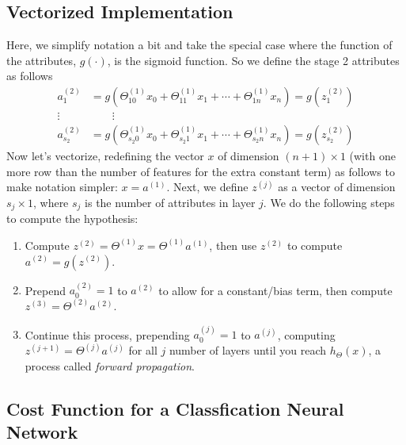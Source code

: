 \documentclass[12pt]{article}
\begin{document}
\newpage
\subsection{Vectorized Implementation}

Here, we simplify notation a bit and take the special case where the
function of the attributes, $g(\cdot)$, is the sigmoid
function. So we define the stage 2 attributes as follows
\begin{align*}
    a_1^{(2)} &= g\left(\Theta_{10}^{(1)} x_0 
	+ \Theta_{11}^{(1)} x_1 + \cdots 
	+ \Theta_{1n}^{(1)} x_n\right) = g\left(z_1^{(2)}\right)
    \\ 
    \vdots \quad & \qquad \vdots\\
    a_{s_2}^{(2)} &= g\left(\Theta_{s_2 0}^{(1)} x_0 
	+ \Theta_{s_2 1}^{(1)} x_1 + \cdots 
	+ \Theta_{s_2 n}^{(1)} x_n\right) 
	= g\left(z_{s_2}^{(2)}\right)
\end{align*}
Now let's vectorize, redefining the vector $x$ of dimension 
$(n+1)\times1$ (with one more row than the number of features for the 
extra constant term) as follows to make notation
simpler: $x = a^{(1)}$. Next, we define $z^{(j)}$ as a vector of 
dimension $s_j \times 1$, where $s_j$ is the number of attributes in 
layer $j$. We do the following steps to compute the hypothesis:
\begin{enumerate}
    \item Compute $z^{(2)} = \Theta^{(1)} x = \Theta^{(1)} a^{(1)}$,
	then use $z^{(2)}$ to compute $a^{(2)} = g(z^{(2)})$.
    \item Prepend $a_0^{(2)}=1$ to $a^{(2)}$ to allow for a 
	constant/bias term, then compute $z^{(3)} = \Theta^{(2)}a^{(2)}$.
    \item Continue this process, prepending $a_0^{(j)}=1$ to 
	$a^{(j)}$, computing $z^{(j+1)} = \Theta^{(j)} a^{(j)}$ for
	all $j$ number of layers until you reach $h_\Theta(x)$, a 
	process called \emph{forward propagation}.
\end{enumerate}


\subsection{Cost Function for a Classfication Neural Network}
\end{document}
